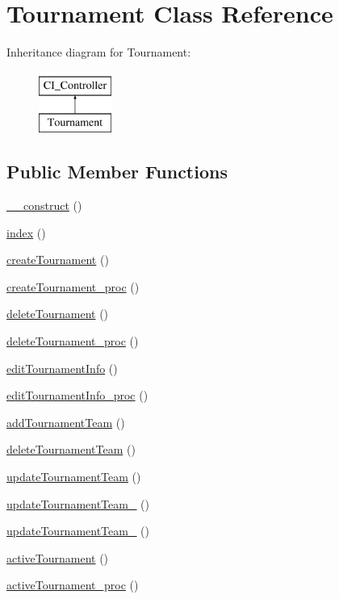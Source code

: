 \hypertarget{class_tournament}{}\section{Tournament Class Reference}
\label{class_tournament}
Inheritance diagram for Tournament\+:\begin{figure}[H]
\begin{center}
\leavevmode
\includegraphics[height=2.000000cm]{class_tournament}
\end{center}
\end{figure}
\subsection*{Public Member Functions}
\begin{DoxyCompactItemize}
\item 
\hyperlink{class_tournament_a095c5d389db211932136b53f25f39685}{\+\_\+\+\_\+construct} ()
\item 
\hyperlink{class_tournament_a149eb92716c1084a935e04a8d95f7347}{index} ()
\item 
\hyperlink{class_tournament_a22a9c049fc1a948708f23105fd90f685}{create\+Tournament} ()
\item 
\hyperlink{class_tournament_a258d321bb541581a060c06bff82dc443}{create\+Tournament\+\_\+proc} ()
\item 
\hyperlink{class_tournament_a9f307de23976250e2af8c7c125d22d1c}{delete\+Tournament} ()
\item 
\hyperlink{class_tournament_a276eafb40209442e992789df86352448}{delete\+Tournament\+\_\+proc} ()
\item 
\hyperlink{class_tournament_a06d7123f8bd4e9d9a69ad36cff7f0b0b}{edit\+Tournament\+Info} ()
\item 
\hyperlink{class_tournament_a282dd47a0710e434e376c7169afa3ad9}{edit\+Tournament\+Info\+\_\+proc} ()
\item 
\hyperlink{class_tournament_a91492aa9dee11071d2183a2957864c50}{add\+Tournament\+Team} ()
\item 
\hyperlink{class_tournament_a935c0befa189f9504fefb34aa2743a41}{delete\+Tournament\+Team} ()
\item 
\hyperlink{class_tournament_ab528185ac92a048cd086565639855be7}{update\+Tournament\+Team} ()
\item 
\hyperlink{class_tournament_a29368ac0a9b84e181d55e99bf1da18bb}{update\+Tournament\+Team\+\_} ()
\item 
\hyperlink{class_tournament_a4c3f1c62c6f23834ea67d37e47435f22}{update\+Tournament\+Team\+\_} ()
\item 
\hyperlink{class_tournament_a363c07610c8cf7d3a5fe5a7fb75e8487}{active\+Tournament} ()
\item 
\hyperlink{class_tournament_a14f75718271a22e16794ef2fdb642f01}{active\+Tournament\+\_\+proc} ()
\end{DoxyCompactItemize}
